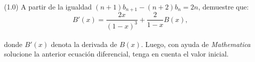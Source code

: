 (1.0) A partir de la igualdad $(n+1)b_{n+1}-(n+2)b_n=2n$, demuestre que:
\begin{equation}
    B'(x)=\frac{2x}{(1-x)^3}+\frac{2}{1-x}B(x),
\end{equation}

donde $B'(x)$ denota la derivada de $B(x)$. Luego, con ayuda de \textit{Mathematica}\textsuperscript{\textregistered} solucione la anterior ecuación diferencial, tenga en cuenta el valor inicial.
